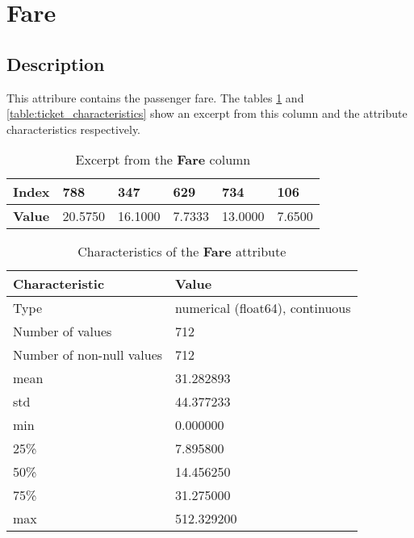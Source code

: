 \section{Fare} \label{section:Fare}
\subsection{Description}
This attribure contains the passenger fare. The tables 
\ref{table:fare_head} and \ref{table:ticket_characteristics} show an 
excerpt from this column and the attribute characteristics respectively.

\begin{table}[!hp]
    \centering
    \caption{Excerpt from the \textbf{Fare} column}
    \begin{tabular}{|l|l|l|l|l|l|}
        \hline
        \textbf{Index} & 788     & 347     & 629    & 734     & 106    \\ \hline
        \textbf{Value} & 20.5750 & 16.1000 & 7.7333 & 13.0000 & 7.6500 \\ \hline
    \end{tabular}
    \label{table:fare_head}
\end{table}

\begin{table}[!hp]
    \centering
    \caption{Characteristics of the \textbf{Fare} attribute}
    \begin{tabular}{|l|l|}
        \hline
        \textbf{Characteristic}   & \textbf{Value}                  \\ \hline
        Type                      & numerical (float64), continuous \\ \hline
        Number of values          & 712                             \\ \hline
        Number of non-null values & 712                             \\ \hline
        mean                      &  31.282893                      \\ \hline
        std                       &  44.377233                      \\ \hline
        min                       &   0.000000                      \\ \hline
        25\%                      &   7.895800                      \\ \hline
        50\%                      &  14.456250                      \\ \hline
        75\%                      &  31.275000                      \\ \hline
        max                       & 512.329200                      \\ \hline
    \end{tabular}
    \label{table:fare_characteristics}
\end{table}

